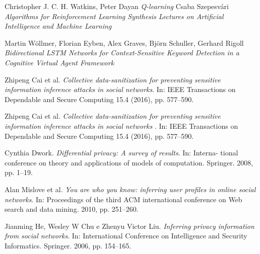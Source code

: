 \begin{thebibliography}{9}
Christopher J. C. H. Watkins, Peter Dayan\newline
\textit{Q-learning}
Csaba Szepesvári\newline
\textit{Algorithms for Reinforcement Learning
Synthesis Lectures on Artificial Intelligence and Machine Learning}

Martin Wöllmer, Florian Eyben, Alex Graves, Björn Schuller, Gerhard Rigoll \newline
\textit{Bidirectional LSTM Networks for Context-Sensitive Keyword Detection in a Cognitive Virtual Agent Framework}

Zhipeng Cai et al.\newline
\textit{Collective data-sanitization for preventing sensitive information inference attacks in social networks}.\newline
In: IEEE Transactions on Dependable and Secure Computing 15.4 (2016), pp. 577–590.

Zhipeng Cai et al.\newline
\textit{Collective data-sanitization for preventing sensitive information inference attacks in social networks}\newline
. In: IEEE Transactions on Dependable and Secure Computing 15.4 (2016), pp. 577–590.

Cynthia Dwork.\newline
\textit{Differential privacy: A survey of results}.\newline
In: Interna- tional conference on theory and applications of models of computation. Springer. 2008, pp. 1–19.

Alan Mislove et al. \newline
\textit{You are who you know: inferring user profiles in online social networks}.\newline
In: Proceedings of the third ACM international conference on Web search and data mining. 2010, pp. 251–260.

Jianming He, Wesley W Chu e Zhenyu Victor Liu. \newline
\textit{Inferring privacy information from social networks}.\newline
In: International Conference on Intelligence and Security Informatics. Springer. 2006, pp. 154–165.


\end{thebibliography}
